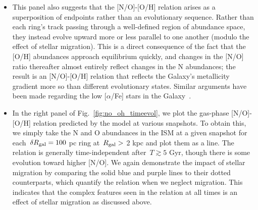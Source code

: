 \documentclass[ms.tex]{subfiles}
\begin{document}
\begin{itemize}
	\item This panel also suggests that the [N/O]-[O/H] relation arises as a 
	superposition of endpoints rather than an evolutionary sequence. 
	Rather than each ring's track passing through a well-defined region of 
	abundance space, they instead evolve upward more or less parallel to one 
	another (modulo the effect of stellar migration). 
	This is a direct consequence of the fact that the [O/H] abundances approach 
	equilibrium quickly, and changes in the [N/O] ratio thereafter almost 
	entirely reflect changes in the N abundances; the result is an [N/O]-[O/H] 
	relation that reflects the Galaxy's metallicity gradient more so than 
	different evolutionary states. 
	Similar arguments have been made regarding the low [$\alpha$/Fe] stars in 
	the Galaxy~\citep[e.g.][]{Schoenrich2009, Sharma2020}. 

	\item In the right panel of Fig.~\ref{fig:no_oh_timeevol}, we plot the 
	gas-phase [N/O]-[O/H] relation predicted by the model at various snapshots. 
	To obtain this, we simply take the N and O abundances in the ISM at a given 
	snapshot for each~$\delta R_\text{gal} = 100$ pc ring at~$R_\text{gal} >$ 2 kpc and 
	plot them as a line. 
	The relation is generally time-independent after~$T \gtrsim 5$ Gyr, though 
	there is some evolution toward higher [N/O]. 
	We again demonstrate the impact of stellar migration by comparing the solid 
	blue and purple lines to their dotted counterparts, which quantify the 
	relation when we neglect migration. 
	This indicates that the complex features seen in the relation at all times 
	is an effect of stellar migration as discussed above. 


\end{itemize}
\end{document}
